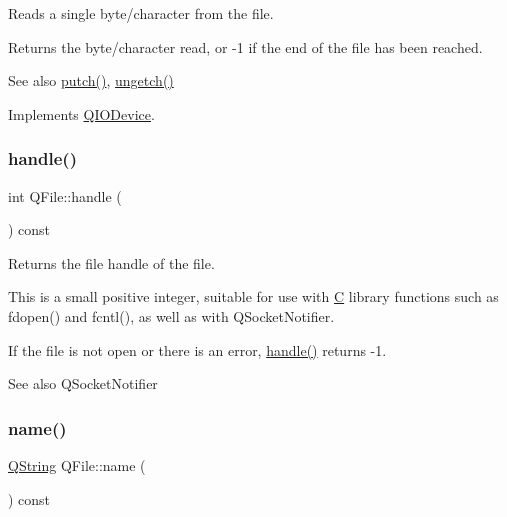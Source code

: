 Reads a single byte/character from the file.

Returns the byte/character read, or -\/1 if the end of the file has been reached.

\begin{DoxySeeAlso}{See also}
\mbox{\hyperlink{class_q_file_af331c4e27024f12383958e65c6a828a3}{putch()}}, \mbox{\hyperlink{class_q_file_afb01a04cda09b3cc61babb5d334a052c}{ungetch()}} 
\end{DoxySeeAlso}


Implements \mbox{\hyperlink{class_q_i_o_device_a7cef61d66023f9cda6b0912082bd19fc}{Q\+I\+O\+Device}}.

\mbox{\label{class_q_file_a79e6ed6f6cbb283332fefd0805fbafe7}} 
\subsubsection{\texorpdfstring{handle()}{handle()}}
{\footnotesize\ttfamily int Q\+File\+::handle (\begin{DoxyParamCaption}{ }\end{DoxyParamCaption}) const}

Returns the file handle of the file.

This is a small positive integer, suitable for use with \mbox{\hyperlink{class_c}{C}} library functions such as fdopen() and fcntl(), as well as with Q\+Socket\+Notifier.

If the file is not open or there is an error, \mbox{\hyperlink{class_q_file_a79e6ed6f6cbb283332fefd0805fbafe7}{handle()}} returns -\/1.

\begin{DoxySeeAlso}{See also}
Q\+Socket\+Notifier 
\end{DoxySeeAlso}
\mbox{\label{class_q_file_ad14b368c041b9e2d22bbd4428f859b29}} 
\subsubsection{\texorpdfstring{name()}{name()}}
{\footnotesize\ttfamily \mbox{\hyperlink{class_q_string}{Q\+String}} Q\+File\+::name (\begin{DoxyParamCaption}{ }\end{DoxyParamCaption}) const\hspace{0.3cm}{\ttfamily [inline]}}

